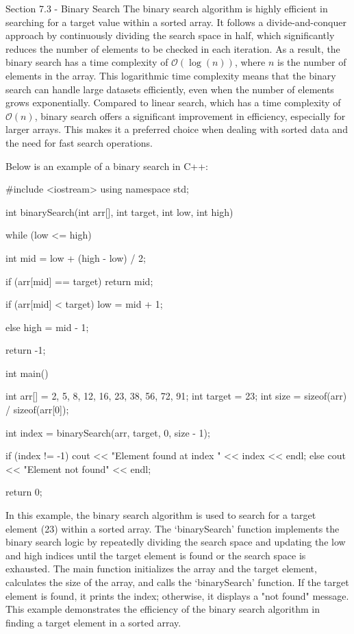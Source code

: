 \begin{notes}{Section 7.3 - Binary Search}
    The binary search algorithm is highly efficient in searching for a target value within a sorted array. It follows a divide-and-conquer approach by continuously dividing the search space in half, which significantly reduces the number of elements to be checked in each iteration. As a result, the binary search has a time complexity 
    of $\mathcal{O}(\log{(n)})$, where $n$ is the number of elements in the array. This logarithmic time complexity means that the binary search can handle large datasets efficiently, even when the number of elements grows exponentially. Compared to linear search, which has a time complexity of $\mathcal{O}(n)$, binary search offers a significant 
    improvement in efficiency, especially for larger arrays. This makes it a preferred choice when dealing with sorted data and the need for fast search operations.
    
    \begin{highlight}
        Below is an example of a binary search in C++:
    
    \begin{code}[C++]
    #include <iostream>
    using namespace std;
    
    int binarySearch(int arr[], int target, int low, int high) {
        while (low <= high) {
            int mid = low + (high - low) / 2;
            
            if (arr[mid] == target)
                return mid;
            
            if (arr[mid] < target)
                low = mid + 1;
            
            else
                high = mid - 1;
        }
        
        return -1;
    }
    
    int main() {
        int arr[] = {2, 5, 8, 12, 16, 23, 38, 56, 72, 91};
        int target = 23;
        int size = sizeof(arr) / sizeof(arr[0]);
        
        int index = binarySearch(arr, target, 0, size - 1);
        
        if (index != -1)
            cout << "Element found at index " << index << endl;
        else
            cout << "Element not found" << endl;
        
        return 0;
    }
    \end{code}
        In this example, the binary search algorithm is used to search for a target element (23) within a sorted array. The `binarySearch' function implements the binary search logic by repeatedly dividing the search space and updating the low and high indices until the target element is found or the search space is exhausted. 
        The main function initializes the array and the target element, calculates the size of the array, and calls the `binarySearch' function. If the target element is found, it prints the index; otherwise, it displays a "not found" message. This example demonstrates the efficiency of the binary search algorithm in finding 
        a target element in a sorted array.
    \end{highlight}
\end{notes}


